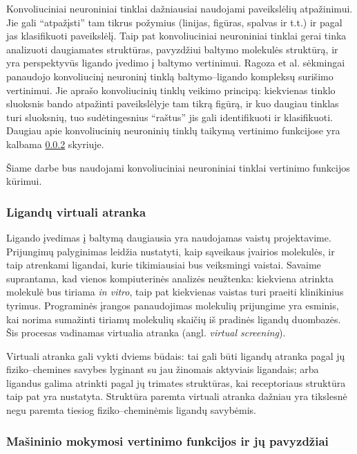 Konvoliuciniai neuroniniai tinklai dažniausiai naudojami paveikslėlių atpažinimui. Jie gali \enquote{atpažįsti} tam tikrus požymius (linijas, figūras, spalvas ir t.t.) ir pagal jas klasifikuoti paveikslėlį. Taip pat konvoliuciniai neuroniniai tinklai gerai tinka analizuoti daugiamates struktūras, pavyzdžiui baltymo molekulės struktūrą, ir yra perspektyvūs ligando įvedimo į baltymo vertinimui.\cite{hochuli_visualizing_2018} Ragoza et al.\cite{ragoza_proteinligand_2017} sėkmingai panaudojo konvoliucinį neuroninį tinklą baltymo--ligando kompleksų surišimo vertinimui. Jie aprašo konvoliucinių tinklų veikimo principą: kiekvienas tinklo sluoksnis bando atpažinti paveikslėlyje tam tikrą figūrą, ir kuo daugiau tinklas turi sluoksnių, tuo sudėtingesnius \enquote{raštus} jis gali identifikuoti ir klasifikuoti. Daugiau apie konvoliucinių neuroninių tinklų taikymą vertinimo funkcijose yra kalbama \ref{sec:vertinimo_funkciju_pavyzdziai} skyriuje.

Šiame darbe bus naudojami konvoliuciniai neuroniniai tinklai vertinimo funkcijos kūrimui. 

\subsubsection{Ligandų virtuali atranka}

Ligando įvedimas į baltymą daugiausia yra naudojamas vaistų projektavime. Prijungimų palyginimas leidžia nustatyti, kaip sąveikaus įvairios molekulės, ir taip atrenkami ligandai, kurie tikimiausiai bus veiksmingi vaistai. Savaime suprantama, kad vienos kompiuterinės analizės neužtenka: kiekviena atrinkta molekulė bus tiriama \textit{in vitro}, taip pat kiekvienas vaistas turi praeiti klinikinius tyrimus. Programinės įrangos panaudojimas molekulių prijungime yra esminis, kai norima sumažinti tiriamų molekulių skaičių iš pradinės ligandų duombazės.\cite{pereira_boosting_2016} Šis procesas vadinamas virtualia atranka (angl. \textit{virtual screening}). 

Virtuali atranka gali vykti dviems būdais: tai gali būti ligandų atranka pagal jų fiziko--chemines savybes lyginant su jau žinomais aktyviais ligandais; arba ligandus galima atrinkti pagal jų trimates struktūras, kai receptoriaus struktūra taip pat yra nustatyta. Struktūra paremta virtuali atranka dažniau yra tikslesnė negu paremta tiesiog fiziko--cheminėmis ligandų savybėmis.\cite{pereira_boosting_2016}

\subsubsection{Mašininio mokymosi vertinimo funkcijos ir jų pavyzdžiai}
\label{sec:vertinimo_funkciju_pavyzdziai}

